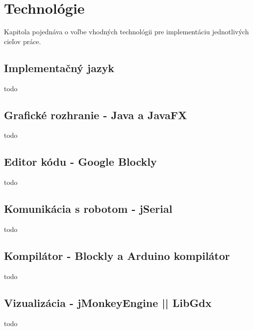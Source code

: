 \chapter{Technológie}
\label{kap:technologie}

Kapitola pojednáva o voľbe vhodných technológii pre implementáciu jednotlivých cieľov práce.

\section{Implementačný jazyk}
todo

\section{Grafické rozhranie - Java a JavaFX}
todo

\section{Editor kódu - Google Blockly}
\label{kap:GrafickyProgramovaciJayzk}
todo

\section{Komunikácia s robotom - jSerial}
todo

\section{Kompilátor - Blockly a Arduino kompilátor}
todo

\section{Vizualizácia - jMonkeyEngine || LibGdx}
todo
